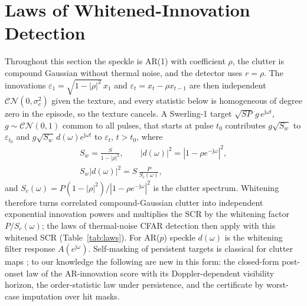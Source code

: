 \section{Laws of Whitened-Innovation Detection}\label{sec:laws}
Throughout this section the speckle is AR(1) with coefficient $\rho$, the clutter is compound Gaussian without thermal noise, and the detector uses $r=\rho$. The innovations $\varepsilon_1=\sqrt{1-|\rho|^2}\,x_1$ and $\varepsilon_t=x_t-\rho x_{t-1}$ are then independent $\mathcal{CN}(0,\sigma_e^2)$ given the texture, and every statistic below is homogeneous of degree zero in the episode, so the texture cancels. A Swerling-1 target $\sqrt{SP}\,g\,e^{\mathrm j\omega t}$, $g\sim\mathcal{CN}(0,1)$ common to all pulses, that starts at pulse $t_0$ contributes $g\sqrt{S_w}$ to $\varepsilon_{t_0}$ and $g\sqrt{S_w}\,d(\omega)e^{\mathrm j\omega t}$ to $\varepsilon_t$, $t>t_0$, where
\begin{equation}
\begin{gathered}
S_w=\frac{S}{1-|\rho|^2},\qquad |d(\omega)|^2=|1-\rho e^{-\mathrm j\omega}|^2,\\
S_w|d(\omega)|^2=S\,\frac{P}{S_c(\omega)},
\end{gathered}
\label{eq:whitenedscr}
\end{equation}
and $S_c(\omega)=P(1-|\rho|^2)/|1-\rho e^{-\mathrm j\omega}|^2$ is the clutter spectrum. Whitening therefore turns correlated compound-Gaussian clutter into independent exponential innovation powers and multiplies the SCR by the whitening factor $P/S_c(\omega)$; the laws of thermal-noise CFAR detection then apply with this whitened SCR (Table~\ref{tab:laws}). For AR($p$) speckle $d(\omega)$ is the whitening filter response $A(e^{\mathrm j\omega})$. Self-masking of persistent targets is classical for clutter maps \cite{lops1989,naldi1999}; to our knowledge the following are new in this form: the closed-form post-onset law of the AR-innovation score with its Doppler-dependent visibility horizon, the order-statistic law under persistence, and the certificate by worst-case imputation over hit masks.

